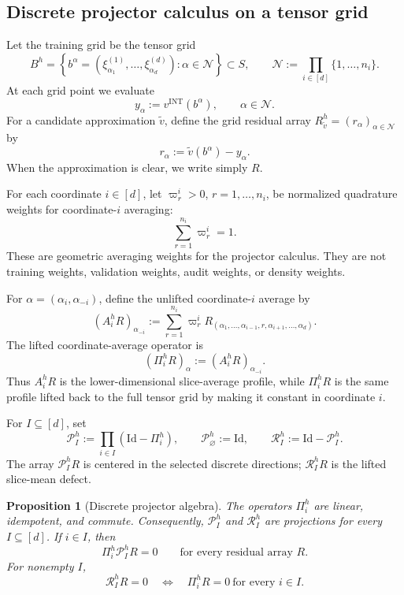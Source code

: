 \documentclass[11pt,letterpaper]{article}
\newtheorem{proposition}[theorem]{Proposition}
\theoremstyle{definition}
\theoremstyle{remark}
\newcommand{\Id}{\mathrm{Id}}
\newcommand{\INT}{\mathrm{INT}}
\begin{document}
\subsection{Discrete projector calculus on a tensor grid } 
\label{subsec:framework_discrete_projectors}

Let the training grid be the tensor grid
$$
B^h
=
\left\{
b^\alpha=
(\xi_{\alpha_1}^{(1)},\ldots,\xi_{\alpha_d}^{(d)}):
\alpha\in\mathcal N
\right\}
\subset S,
\qquad
\mathcal N:=\prod_{i\in[d]}\{1,\ldots,n_i\}.
$$
At each grid point we evaluate
$$
y_\alpha:=v^{\INT}(b^\alpha),
\qquad
\alpha\in\mathcal N.
$$
For a candidate approximation $\widetilde v$, define the grid residual array
$R_{\widetilde v}^h=(r_\alpha)_{\alpha\in\mathcal N}$ by
$$
r_\alpha:=\widetilde v(b^\alpha)-y_\alpha .
$$
When the approximation is clear, we write simply $R$.

For each coordinate $i\in[d]$, let $\varpi_r^i>0$, $r=1,\ldots,n_i$, be
normalized quadrature weights for coordinate-$i$ averaging:
$$
\sum_{r=1}^{n_i}\varpi_r^i=1.
$$
These are geometric averaging weights for the projector calculus. They are not
training weights, validation weights, audit weights, or density weights.

For $\alpha=(\alpha_i,\alpha_{-i})$, define the unlifted coordinate-$i$
average by
$$
(A_i^hR)_{\alpha_{-i}}
:=
\sum_{r=1}^{n_i}
\varpi_r^i
R_{(\alpha_1,\ldots,\alpha_{i-1},r,\alpha_{i+1},\ldots,\alpha_d)}.
$$
The lifted coordinate-average operator is
$$
(\Pi_i^hR)_\alpha:=(A_i^hR)_{\alpha_{-i}}.
$$
Thus $A_i^hR$ is the lower-dimensional slice-average profile, while
$\Pi_i^hR$ is the same profile lifted back to the full tensor grid by making it
constant in coordinate $i$.

For $I\subseteq[d]$, set
$$
\mathcal P_I^h
:=
\prod_{i\in I}(\Id-\Pi_i^h),
\qquad
\mathcal P_\varnothing^h:=\Id,
\qquad
\mathcal R_I^h:=\Id-\mathcal P_I^h.
$$
The array $\mathcal P_I^hR$ is centered in the selected discrete directions;
$\mathcal R_I^hR$ is the lifted slice-mean defect.

\begin{proposition}[Discrete projector algebra]
\label{prop:discrete_projector_algebra_framework}
The operators $\Pi_i^h$ are linear, idempotent, and commute. Consequently,
$\mathcal P_I^h$ and $\mathcal R_I^h$ are projections for every
$I\subseteq[d]$. If $i\in I$, then
$$
\Pi_i^h\mathcal P_I^hR=0
\qquad
\text{for every residual array }R.
$$
For nonempty $I$,
$$
\mathcal R_I^hR=0
\quad\Longleftrightarrow\quad
\Pi_i^hR=0\ \text{for every }i\in I.
$$
\end{proposition}
\end{document}
